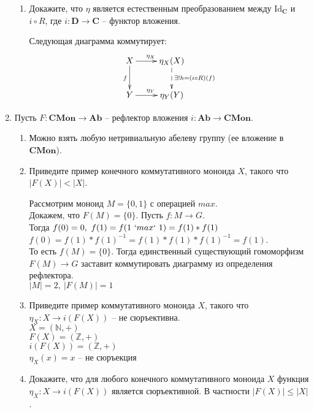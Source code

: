 \documentclass[draft]{article}
\newcommand{\cat}[1]{\mathbf{#1}}
\renewcommand{\C}{\cat{C}}
\newcommand{\D}{\cat{D}}
\newcommand{\CMon}{\cat{CMon}}
\newcommand{\Ab}{\cat{Ab}}
\newcommand{\fs}[1]{\mathrm{#1}}
\begin{document}
\begin{enumerate}
\begin{enumerate}
\item Докажите, что $\eta$ является естественным преобразованием между $\fs{Id}_\C$ и $i \circ R$, где $i : \D \to \C$ -- функтор вложения.

Следующая диаграмма коммутирует:
\[
\xymatrix{
X \ar[r]^{\eta_X} \ar[d]_{f} & \eta_X(X) \ar@{-->}[d]^{\exists!h = (i \circ R) (f)} \\
Y \ar[r]^{\eta_Y} &  \eta_Y(Y)
}
\]
\end{enumerate}

\item Пусть $F : \CMon \to \Ab$ -- рефлектор вложения $i : \Ab \to \CMon$.
\begin{enumerate}
\item {}

Можно взять любую нетривиальную абелеву группу (ее вложение в $\CMon$).
\item Приведите пример конечного коммутативного моноида $X$, такого что $|F(X)| < |X|$.

Рассмотрим моноид $M = \{0, 1\}$ с операцией $max$.\\
Докажем, что $F(M) = \{0\}$. Пусть $f : M \to G$. \\
Тогда $f(0) = 0,~f(1) = f(1 ~`max`~ 1) = f(1)\ast f(1)$
$f(0) = f(1) \ast f(1)^{-1} = f(1) \ast  f(1) \ast f(1)^{-1} = f(1)$. \\
То есть $f(M) = \{0\}$. Тогда единственный существующий гомоморфизм $F(M) \to G$ заставит коммутировать диаграмму из определения рефлектора.\\

$|M| = 2, ~|F(M)| = 1$


\item Приведите пример коммутативного моноида $X$, такого что $\eta_X : X \to i(F(X))$ -- не сюръективна.\\

$X = (\mathbb{N}, +)$\\
$F(X) = (\mathbb{Z}, +)$\\
$i(F(X)) = (\mathbb{Z}, +)$\\
$\eta_X(x) = x$ -- не сюръекция

\item Докажите, что для любого конечного коммутативного моноида $X$ функция $\eta_X : X \to i(F(X))$ является сюръективной. В частности $|F(X)| \leq |X|$.
\end{enumerate}

\end{enumerate}
\end{document}
